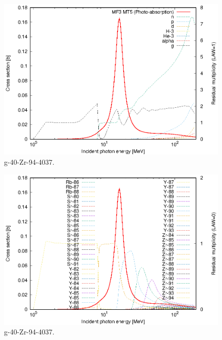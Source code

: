 \begin{figure}
 \includegraphics[width=\linewidth]{eps/g_40-Zr-94_4037.eps}
  \caption{g-40-Zr-94-4037.}
\end{figure}
\begin{figure}
 \includegraphics[width=\linewidth]{eps-law0/g_40-Zr-94_4037.eps}
 \caption{g-40-Zr-94-4037.}
\end{figure}
\newpage \clearpage

